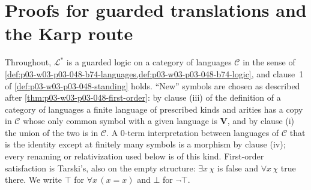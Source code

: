 \section{Proofs for guarded translations and the Karp route}
\label{sec:annex-p03-w03-p03-048-barwise}

Throughout, \(\mathcal L^{\ast}\) is a guarded logic on a category of languages
\(\mathcal C\) in the sense of
\cref{def:p03-w03-p03-048-b74-languages,def:p03-w03-p03-048-b74-logic},
and clause~1 of \cref{def:p03-w03-p03-048-standing} holds.  ``New'' symbols
are chosen as described after \cref{thm:p03-w03-p03-048-first-order}: by
clause (iii) of the definition of a category of languages a finite language
of prescribed kinds and arities has a copy in \(\mathcal C\) whose only
common symbol with a given language is \(\mathbf V\), and by clause (i) the
union of the two is in \(\mathcal C\).  A \(0\)-term interpretation between
languages of \(\mathcal C\) that is the identity except at finitely many
symbols is a morphism by clause (iv); every renaming or relativization used
below is of this kind.  First-order satisfaction is Tarski's, also on the
empty structure: \(\exists x\,\chi\) is false and \(\forall x\,\chi\) true
there.  We write \(\top\) for \(\forall x\,(x=x)\) and \(\bot\) for
\(\neg\top\).

